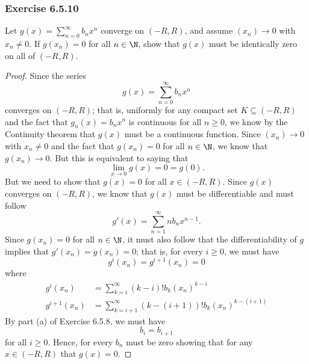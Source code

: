 \subsubsection{Exercise 6.5.10}  Let \( g(x) = \sum_{ n=0  }^{ \infty  } b_n x^n  \) converge on \( (-R ,R ) \), and assume \( (x_n) \to 0  \) with \( x_n \neq 0  \). If \( g(x_n) = 0  \) for all \( n \in \N  \), show that \( g(x)  \) must be identically zero on all of \( (-R ,R ) \).
\begin{proof}
Since the series 
\[  g(x) = \sum_{ n=0 }^{ \infty  } b_n x^n  \] converges on \( (-R ,R ) \); that is, uniformly for any compact set \( K \subseteq (-R ,R ) \) and the fact that \( g_n(x) = b_n x^n  \) is continuous for all \( n \geq 0  \), we know by the Continuity theorem that \( g(x)  \) must be a continuous function. Since \( (x_n) \to 0 \) with \( x_n \neq 0  \) and the fact that \( g(x_n) = 0  \) for all \( n \in \N  \), we know that \( g(x_n) \to 0  \). But this is equivalent to saying that 
\[  \lim_{ x \to 0  } g(x) = 0 = g(0).\]
But we need to show that \( g(x) = 0  \) for all \( x \in (-R ,R ) \). Since \( g(x)  \) converges on \( (-R ,R ) \), we know that \( g(x) \) must be differentiable and must follow 
\[  g'(x) = \sum_{ n=1  }^{ \infty  } n b_n x^{n-1}. \]
Since \( g(x_n) = 0  \) for all \( n \in \N  \), it must also follow that the differentiability of \( g  \) implies that \( g'(x_n) = g(x_n) = 0  \); that is, for every \( i \geq 0  \), we must have 
\[ g^{i} (x_{n})  = g^{i+1} (x_{n}) = 0  \] where 
\begin{align*}
    g^{i}(x_n) &= \sum_{ k = i  }^{ \infty  } (k - i )! b_k (x_n)^{k - i}  \\
    g^{i+1}(x_n) &= \sum_{ k= i +1  }^{ \infty  } (k - (i +1))! b_k (x_n)^{k - (i+1)} 
\end{align*} By part (a) of Exercise 6.5.8, we must have 
\[  b_i = b_{i+1} \]  for all \( i \geq 0  \). Hence, for every \( b_n  \) must be zero showing that for any \( x \in (-R ,R ) \) that \( g(x) = 0  \).
\end{proof}












